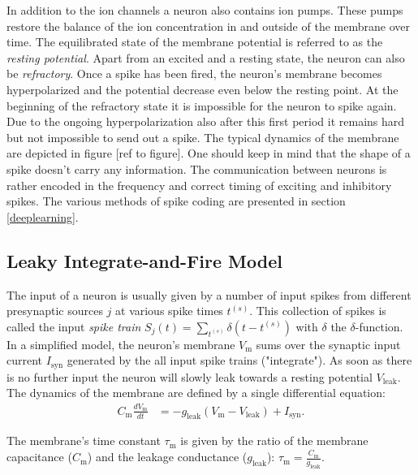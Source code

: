 In addition to the ion channels a neuron also contains ion pumps. These pumps restore the balance of the ion concentration in and outside of the membrane over time. The equilibrated state of the membrane potential is referred to as the \textit{resting potential}. Apart from an excited and a resting state, the neuron can also be \textit{refractory}. Once a spike has been fired, the neuron's membrane becomes hyperpolarized and the potential decrease even below the resting point. At the beginning of the refractory state it is impossible for the neuron to spike again. Due to the ongoing hyperpolarization also after this first period it remains hard but not impossible to send out a spike. The typical dynamics of the membrane are depicted in figure [ref to figure]. One should keep in mind that the shape of a spike doesn't carry any information.  The communication between neurons is rather encoded in the frequency and correct timing of exciting and inhibitory spikes. The various methods of spike coding are presented in section \ref{deeplearning}. 

\subsection{Leaky Integrate-and-Fire Model}

The input of a neuron is usually given by a number of input spikes from different presynaptic sources $j$ at various spike times $t^{(s)}$. This collection of spikes is called the input \textit{spike train} $S_j(t) = \sum_{t^{(s)}} \delta(t - t^{(s)})$ with $\delta$ the $\delta$-function. In a simplified model, the neuron's membrane $V_{\text{m}}$ sums over the synaptic input current $I_{\text{syn}}$ generated by the all input spike trains ("integrate"). As soon as there is no further input the neuron will slowly leak towards a resting potential $V_\text{leak}$. The dynamics of the membrane are defined by a single differential equation:
\begin{align}
C_{\text{m}} \frac{dV_{\text{m}}}{dt} &= -g_{\text{leak}} (V_{\text{m}} - V_{\text{leak}}) + I_{\text{syn}}.
\end{align}

The membrane's time constant $\tau_{\text{m}}$ is given by the ratio of the membrane capacitance ($C_{\text{m}}$) and the leakage conductance ($g_{\text{leak}}$): $\tau_{\text{m}} = \frac{C_{\text{m}}}{g_{\text{leak}}}$. 

